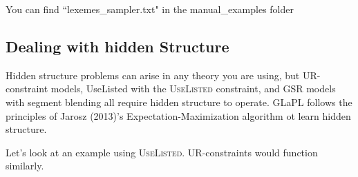 \documentclass[12]{article}
\begin{document}
	You can find ``lexemes\_sampler.txt" in the manual\_examples folder
	
	
	
	
	
	
	
	
	
	
	\subsection{Dealing with hidden Structure}
	
	Hidden structure problems can arise in any theory you are using, but UR-constraint models, UseListed with the \textsc{UseListed} constraint, and GSR models with segment blending all require hidden structure to operate.  GLaPL follows the principles of Jarosz (2013)'s Expectation-Maximization algorithm ot learn hidden structure.  
	
	Let's look at an example using \textsc{UseListed}.  UR-constraints would function similarly. 
	
\end{document}
